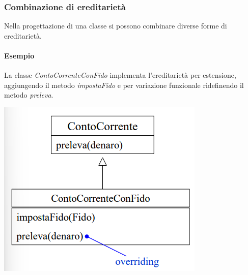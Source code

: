 \documentclass{article}
\begin{document}
	\subsubsection{Combinazione di ereditarietà}
	Nella progettazione di una classe si possono combinare diverse forme di ereditarietà.
	\paragraph*{Esempio} La classe \textit{ContoCorrenteConFido} implementa l'ereditarietà per estensione, aggiungendo il metodo \textit{impostaFido} e per variazione funzionale ridefinendo il metodo \textit{preleva}.
	\begin{center}
		\includegraphics[scale=0.7]{assets/ereditarieta_combinazione.png}
	\end{center}
\end{document}
